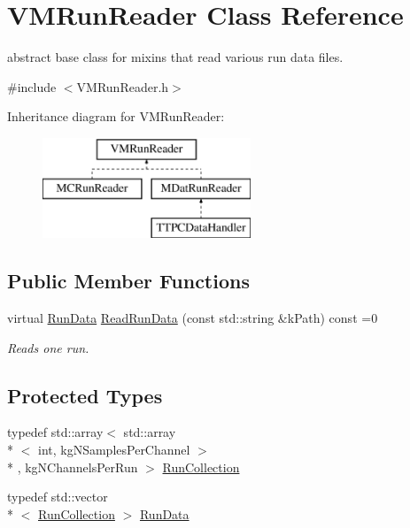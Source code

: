 \hypertarget{class_v_m_run_reader}{\section{V\+M\+Run\+Reader Class Reference}
\label{class_v_m_run_reader}
}


abstract base class for mixins that read various run data files.  




{\ttfamily \#include $<$V\+M\+Run\+Reader.\+h$>$}

Inheritance diagram for V\+M\+Run\+Reader\+:\begin{figure}[H]
\begin{center}
\leavevmode
\includegraphics[height=3.000000cm]{class_v_m_run_reader}
\end{center}
\end{figure}
\subsection*{Public Member Functions}
\begin{DoxyCompactItemize}
\item 
virtual \hyperlink{class_v_m_run_reader_aa84c99e50235a10f563b3487b3930602}{Run\+Data} \hyperlink{class_v_m_run_reader_afe0f812890dcb11638a66c878f0d8765}{Read\+Run\+Data} (const std\+::string \&k\+Path) const =0
\begin{DoxyCompactList}\small\item\em Reads one run. \end{DoxyCompactList}\end{DoxyCompactItemize}
\subsection*{Protected Types}
\begin{DoxyCompactItemize}
\item 
typedef std\+::array$<$ std\+::array\\*
$<$ int, kg\+N\+Samples\+Per\+Channel $>$\\*
, kg\+N\+Channels\+Per\+Run $>$ \hyperlink{class_v_m_run_reader_aca02fe95a36b6651ad0cf4bc7a8d02e4}{Run\+Collection}
\item 
typedef std\+::vector\\*
$<$ \hyperlink{class_v_m_run_reader_aca02fe95a36b6651ad0cf4bc7a8d02e4}{Run\+Collection} $>$ \hyperlink{class_v_m_run_reader_aa84c99e50235a10f563b3487b3930602}{Run\+Data}
\end{DoxyCompactItemize}
